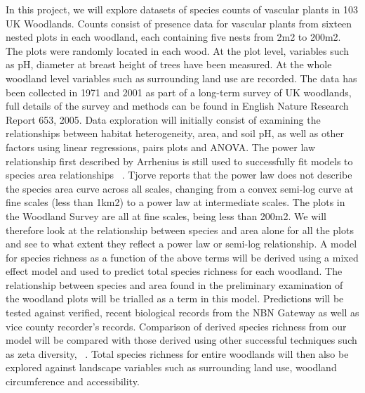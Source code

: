 \documentclass[a4paper]{article}
\begin{document}
In this project, we will explore datasets of species counts of vascular plants in 103 UK Woodlands. Counts consist of presence data for vascular plants from sixteen nested plots in each woodland, each containing five nests from 2m2 to 200m2.  The plots were randomly located in each wood. At the plot level, variables such as pH, diameter at breast height of trees have been measured. At the whole woodland level variables such as surrounding land use are recorded. The data has been collected in 1971 and 2001 as part of a long-term survey of UK woodlands, full details of the survey and methods can be found in English Nature Research Report 653, 2005.
Data exploration will initially consist of examining the relationships between habitat heterogeneity, area, and soil pH, as well as other factors using linear regressions, pairs plots and ANOVA. 
The power law relationship first described by Arrhenius is still used to successfully fit models to species area relationships ~\cite{principles}. Tjorve reports that the power law does not describe the species area curve across all scales, changing from a convex semi-log curve at fine scales (less than 1km2) to a power law at intermediate scales. The plots in the Woodland Survey are all at fine scales, being less than 200m2. We will therefore look at the relationship between species and area alone for all the plots and see to what extent they reflect a power law or semi-log relationship. 
A model for species richness as a function of the above terms will be derived using a mixed effect model and used to predict total species richness for each woodland.  The relationship between species and area found in the preliminary examination of the woodland plots will be trialled as a term in this model. Predictions will be tested against verified, recent biological records from the NBN Gateway as well as vice county recorder’s records. Comparison of derived species richness from our model will be compared with those derived using other successful techniques such as zeta diversity, ~\cite{hui2014zeta}. Total species richness for entire woodlands will then also be explored against landscape variables such as surrounding land use, woodland circumference and accessibility.


  
\end{document}
